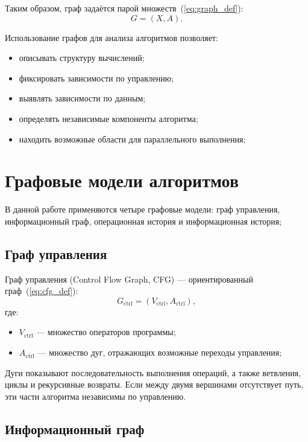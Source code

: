 Таким образом, граф задаётся парой множеств~(\ref{eq:graph_def}):
\begin{equation}
	G = (X, A).
	\label{eq:graph_def}
\end{equation}

Использование графов для анализа алгоритмов позволяет:
\begin{itemize}
	\item описывать структуру вычислений;
	\item фиксировать зависимости по управлению;
	\item выявлять зависимости по данным;
	\item определять независимые компоненты алгоритма;
	\item находить возможные области для параллельного выполнения;
\end{itemize}

\section{Графовые модели алгоритмов}

В данной работе применяются четыре графовые модели: граф управления, информационный граф, операционная история и информационная история;

\subsection{Граф управления}

Граф управления (Control Flow Graph, CFG) --- ориентированный граф~(\ref{eq:cfg_def}):
\begin{equation}
	G_{\text{ctrl}} = (V_{\text{ctrl}}, A_{\text{ctrl}}),
	\label{eq:cfg_def}
\end{equation}
где:
\begin{itemize}
	\item $V_{\text{ctrl}}$ --- множество операторов программы;
	\item $A_{\text{ctrl}}$ --- множество дуг, отражающих возможные переходы управления;
\end{itemize}

Дуги показывают последовательность выполнения операций, а также ветвления, циклы и рекурсивные возвраты. Если между двумя вершинами отсутствует путь, эти части алгоритма независимы по управлению.

\subsection{Информационный граф}

